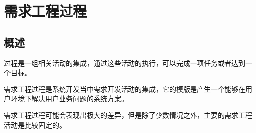 \section{需求工程过程}

\subsection{概述}
过程是一组相关活动的集成，通过这些活动的执行，可以完成一项任务或者达到一个目标。

需求工程过程是系统开发当中需求开发活动的集成，它的模版是产生一个能够在用户环境下解决用户业务问题的系统方案。

需求工程过程可能会表现出极大的差异，但是除了少数情况之外，主要的需求工程活动是比较固定的。

\begin{figure}[H]
	\setcounter{subfigure}{0}
	\centering
	\vspace{-0.5em}	
	\centering
	\vspace{-1em}
\end{figure}

